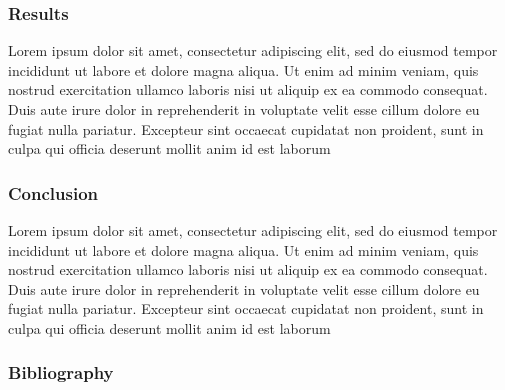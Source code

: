 \documentclass[10pt]{beamer}
\begin{document}
\begin{frame}
  \frametitle{Results}
  \begin{block}{}
    Lorem ipsum dolor sit amet, consectetur adipiscing elit, sed do eiusmod tempor incididunt ut labore et dolore magna aliqua. Ut enim ad minim veniam, quis nostrud exercitation ullamco laboris nisi ut aliquip ex ea commodo consequat. Duis aute irure dolor in reprehenderit in voluptate velit esse cillum dolore eu fugiat nulla pariatur. Excepteur sint occaecat cupidatat non proident, sunt in culpa qui officia deserunt mollit anim id est laborum
  \end{block} 
\end{frame}


\begin{frame}
  \frametitle{Conclusion}
  \begin{block}{}
    Lorem ipsum dolor sit amet, consectetur adipiscing elit, sed do eiusmod tempor incididunt ut labore et dolore magna aliqua. Ut enim ad minim veniam, quis nostrud exercitation ullamco laboris nisi ut aliquip ex ea commodo consequat. Duis aute irure dolor in reprehenderit in voluptate velit esse cillum dolore eu fugiat nulla pariatur. Excepteur sint occaecat cupidatat non proident, sunt in culpa qui officia deserunt mollit anim id est laborum
  \end{block} 
\end{frame}


\begin{frame}
  \frametitle{Bibliography}
  \begin{block}{}
    {
        \small
    }
  \end{block} 
\end{frame}
\end{document}
